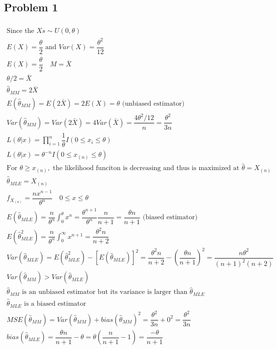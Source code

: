 \documentclass{article}
\newcommand{\hth}{\hat{\theta}}
\newcommand{\prodn}{\prod_{i=1}^{n}}
\newcommand{\mle}{\hat{\theta}_{MLE}}
\newcommand{\mm}{\hat{\theta}_{MM}}
\begin{document}
\begin{flushleft}

	\section*{Problem 1}
	
\begin{multline*}\\
\text{Since the } Xs\sim U(0,\theta)\\
E(X)=\dfrac{\theta}{2} \text{ and } Var(X)=\dfrac{\theta^2}{12}\\
E(X)=\dfrac{\theta}{2} \quad M=\bar{X}\\
\theta/2=\bar{X}\\
\hth_{MM}=2\bar{X}\\
E(\hth_{MM})=E(2\bar{X})=2E(X)=\theta \text{ (unbiased estimator)}\\
Var(\hth_{MM})=Var(2\bar{X})=4Var(\bar{X})=\dfrac{4\theta^2/12}{n}=\dfrac{\theta^2}{3n}\\
L(\theta|x)=\prodn \dfrac{1}{\theta}I(0\leq x_i\leq \theta)\\
L(\theta|x)=\theta^{-n} I(0\leq x_{(n)}\leq \theta)\\
\text{For } \theta\geq x_{(n)}, \text{ the likelihood funciton is decreasing and thus is maximized at } \hth=X_{(n)}\\
\hth_{MLE}=X_{(n)}\\
f_{X_{(n)}}=\dfrac{nx^{n-1}}{\theta^n}\quad 0\leq x\leq \theta\\
E(\hth_{MLE})=\dfrac{n}{\theta^n}\int_{0}^{\theta}x^n=\dfrac{\theta^{n+1}}{\theta^n}\dfrac{n}{n+1}=\dfrac{\theta n}{n+1}\text{ (biased estimator)}\\
E(\hth_{MLE}^2)=\dfrac{n}{\theta^n}\int_{0}^{\infty}x^{n+1}=\dfrac{\theta^2 n}{n+2}\\
Var(\hth_{MLE})=E(\hth_{MLE}^2)-[E(\hth_{MLE})]^2=\dfrac{\theta^2 n}{n+2}-\left(\dfrac{\theta n}{n+1}\right)^2=\dfrac{n\theta^2}{(n+1)^2(n+2)}\\
Var(\hth_{MM})>Var(\hth_{MLE})\\
\hth_{MM} \text{ is an unbiased estimator but its variance is larger than } \hth_{MLE}\\
\hth_{MLE} \text{ is a biased estimator}\\
MSE(\mm)=Var(\mm)+bias(\mm)^2=\dfrac{\theta^2}{3n}+0^2=\dfrac{\theta^2}{3n}\\
bias(\mle)=\dfrac{\theta n}{n+1}-\theta=\theta\left(\dfrac{n}{n+1}-1\right)=\dfrac{-\theta}{n+1}\\

\end{multline*}
\end{flushleft}
\end{document}
